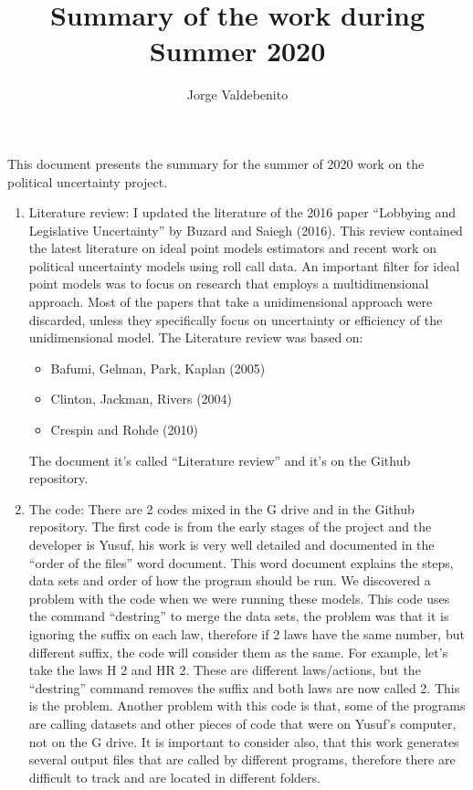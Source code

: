 \documentclass[a4paper,12pt]{article}
\begin{document}
\title{\vspace{-1.5 cm}Summary of the work during Summer 2020}
\author{Jorge Valdebenito}
\maketitle

This document presents the summary for the summer of 2020 work on the political uncertainty project. 
\begin{enumerate}
\item Literature review:
I updated the literature of the 2016 paper “Lobbying and Legislative Uncertainty” by Buzard and Saiegh (2016). This review contained the latest literature on ideal point models estimators and recent work on political uncertainty models using roll call data. An important filter for ideal point models was to focus on research that employs a multidimensional approach. Most of the papers that take a unidimensional approach were discarded, unless they specifically focus on uncertainty or efficiency of the unidimensional model.
The Literature review was based on:

\begin{itemize}
\item Bafumi, Gelman, Park, Kaplan (2005) 
\item Clinton, Jackman, Rivers (2004)
\item Crespin and Rohde (2010)
\end{itemize}
The document it’s called “Literature review” and it’s on the Github repository.



\item The code:
There are 2 codes mixed in the G drive and in the Github repository. The first code is from the early stages of the project and the developer is Yusuf, his work is very well detailed and documented in the “order of the files” word document. This word document explains the steps, data sets and order of how the program should be run. We discovered a problem with the code when we were running these models. This code uses the command “destring” to merge the data sets, the problem was that it is ignoring the suffix on each law, therefore if 2 laws have the same number, but different suffix, the code will consider them as the same. 
For example, let’s take the laws H 2 and HR 2. These are different laws/actions, but the “destring” command removes the suffix and both laws are now called 2. This is the problem. 
Another problem with this code is that, some of the programs are calling datasets and other pieces of code that were on Yusuf’s computer, not on the G drive. It is important to consider also, that this work generates several output files that are called by different programs, therefore there are difficult to track and are located in different folders. 


\end{enumerate}
\end{document}
